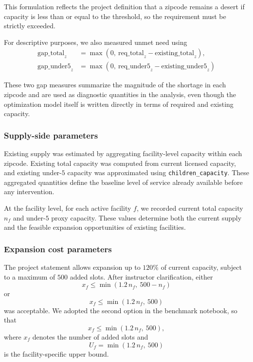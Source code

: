 \documentclass[11pt]{article}
\newcommand{\1}{\mathbb{I}}
\begin{document}
This formulation reflects the project definition that a zipcode remains a desert if capacity is less than or equal to the threshold, so the requirement must be strictly exceeded.

For descriptive purposes, we also measured unmet need using
\[
\begin{aligned}
\mathrm{gap\_total}_z &= \max\!\left(0,\ \mathrm{req\_total}_z - \mathrm{existing\_total}_z\right),\\
\mathrm{gap\_under5}_z &= \max\!\left(0,\ \mathrm{req\_under5}_z - \mathrm{existing\_under5}_z\right)
\end{aligned}
\]

These two gap measures summarize the magnitude of the shortage in each zipcode and are used as diagnostic quantities in the analysis, even though the optimization model itself is written directly in terms of required and existing capacity.

\subsubsection{Supply-side parameters}

Existing supply was estimated by aggregating facility-level capacity within each zipcode. Existing total capacity was computed from current licensed capacity, and existing under-\(5\) capacity was approximated using \texttt{children\_capacity}. These aggregated quantities define the baseline level of service already available before any intervention.

At the facility level, for each active facility \(f\), we recorded current total capacity \(n_f\) and under-\(5\) proxy capacity. These values determine both the current supply and the feasible expansion opportunities of existing facilities.

\subsubsection{Expansion cost parameters}

The project statement allows expansion up to \(120\%\) of current capacity, subject to a maximum of \(500\) added slots. After instructor clarification, either
\[
x_f \le \min(1.2\,n_f,\ 500-n_f)
\]
or
\[
x_f \le \min(1.2\,n_f,\ 500)
\]
was acceptable. We adopted the second option in the benchmark notebook, so that
\[
x_f \le \min(1.2\,n_f,\ 500),
\]
where \(x_f\) denotes the number of added slots and
\[
U_f = \min(1.2\,n_f,\ 500)
\]
is the facility-specific upper bound.
\end{document}
